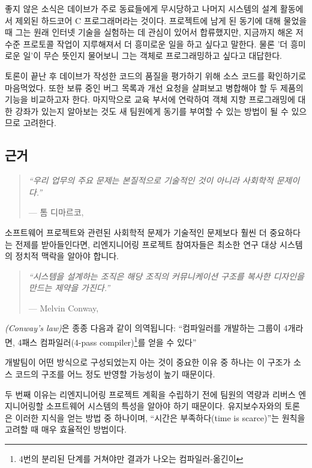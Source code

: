 \documentclass[a4paper,10pt,twoside]{book}
\begin{document}
좋지 않은 소식은 데이브가 주로 동료들에게 무시당하고 나머지 시스템의 설계 활동에서 제외된 하드코어 C 프로그래머라는 것이다. 프로젝트에 남게 된 동기에 대해 물었을 때 그는 원래 인터넷 기술을 실험하는 데 관심이 있어서 합류했지만, 지금까지 해온 저수준 프로토콜 작업이 지루해져서 더 흥미로운 일을 하고 싶다고 말한다. 물론 '더 흥미로운 일'이 무슨 뜻인지 물어보니 그는 객체로 프로그래밍하고 싶다고 대답한다.

토론이 끝난 후 데이브가 작성한 코드의 품질을 평가하기 위해 소스 코드를 확인하기로 마음먹었다. 또한 보류 중인 버그 목록과 개선 요청을 살펴보고 병합해야 할 두 제품의 기능을 비교하고자 한다. 마지막으로 교육 부서에 연락하여 객체 지향 프로그래밍에 대한 강좌가 있는지 알아보는 것도 새 팀원에게 동기를 부여할 수 있는 방법이 될 수 있으므로 고려한다.

\subsection*{근거}

\begin{quotation}
\noindent
\emph{``우리 업무의 주요 문제는 본질적으로 기술적인 것이 아니라 사회학적 문제이다.''}

\hfill --- 톰 디마르코, \cite{DeMa99a}
\end{quotation}

소프트웨어 프로젝트와 관련된 사회학적 문제가 기술적인 문제보다 훨씬 더 중요하다는 전제를 받아들인다면, 리엔지니어링 프로젝트 참여자들은 최소한 연구 대상 시스템의 정치적 맥락을 알아야 합니다.

\begin{quotation}
\noindent
\emph{``시스템을 설계하는 조직은 해당 조직의 커뮤니케이션 구조를 복사한 디자인을 만드는 제약을 가진다.''}

\hfill --- Melvin Conway, \cite{Conw68a}
\end{quotation}

\emph{(Conway's law)}은 종종 다음과 같이 의역됩니다: ``컴파일러를 개발하는 그룹이 4개라면, 4패스 컴파일러(4-pass compiler)\footnote{4번의 분리된 단계를 거쳐야만 결과가 나오는 컴파일러-옮긴이}를 얻을 수 있다''

개발팀이 어떤 방식으로 구성되었는지 아는 것이 중요한 이유 중 하나는 이 구조가 소스 코드의 구조를 어느 정도 반영할 가능성이 높기 때문이다.

두 번째 이유는 리엔지니어링 프로젝트 계획을 수립하기 전에 팀원의 역량과 리버스 엔지니어링할 소프트웨어 시스템의 특성을 알아야 하기 때문이다. 유지보수자와의 토론은 이러한 지식을 얻는 방법 중 하나이며, ``시간은 부족하다(time is scarce)''는 원칙을 고려할 때 매우 효율적인 방법이다.
\end{document}
